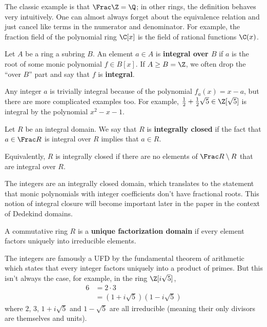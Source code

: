 The classic example is that $\Frac \Z = \Q$; in other rings, the definition behaves very intuitively. One can almost always forget about the equivalence relation and just cancel like terms in the numerator and denominator. For example, the fraction field of the polynomial ring $\C[x]$ is the field of rational functions $\C(x)$.

\begin{definition}
    \label{def:integral-element}
    Let $A$ be a ring a subring $B$. An element $a \in A$ is \textbf{integral over $B$} if $a$ is the root of some monic polynomial $f \in B[x]$. If $A \geq B = \Z$, we often drop the ``over $B$'' part and say that $f$ is \textbf{integral}.
\end{definition}

Any integer $a$ is trivially integral because of the polynomial $f_a(x) = x - a$, but there are more complicated examples too.
For example, $\frac12 + \frac12 \sqrt 5 \in \Z[\sqrt5]$ is integral by the polynomial $x^2 - x - 1$.

\begin{definition}
    \label{def:integrally-closed}
    Let $R$ be an integral domain. We say that $R$ is \textbf{integrally closed} if the fact that $a \in \Frac R$ is integral over $R$ implies that $a \in R$.

    Equivalently, $R$ is integrally closed if there are no elements of $\Frac R \setminus R$ that are integral over $R$.
\end{definition}

The integers are an integrally closed domain, which translates to the statement that monic polynomials with integer coefficients don't have fractional roots.
This notion of integral closure will become important later in the paper in the context of Dedekind domains.

\begin{definition}
    A commutative ring $R$ is a \textbf{unique factorization domain} if every element factors uniquely into irreducible elements.
\end{definition}

The integers are famously a UFD by the fundamental theorem of arithmetic which states that every integer factors uniquely into a product of primes. But this isn't always the case, for example, in the ring $\Z[i \sqrt 5]$,
\begin{equation}
    \begin{aligned}
        6 & = 2 \cdot 3                     \\
          & = (1 + i \sqrt5) (1 - i \sqrt5)
    \end{aligned}
\end{equation}
where $2$, $3$, $1 + i \sqrt 5$ and $1 - \sqrt 5$ are all irreducible (meaning their only divisors are themselves and units).

